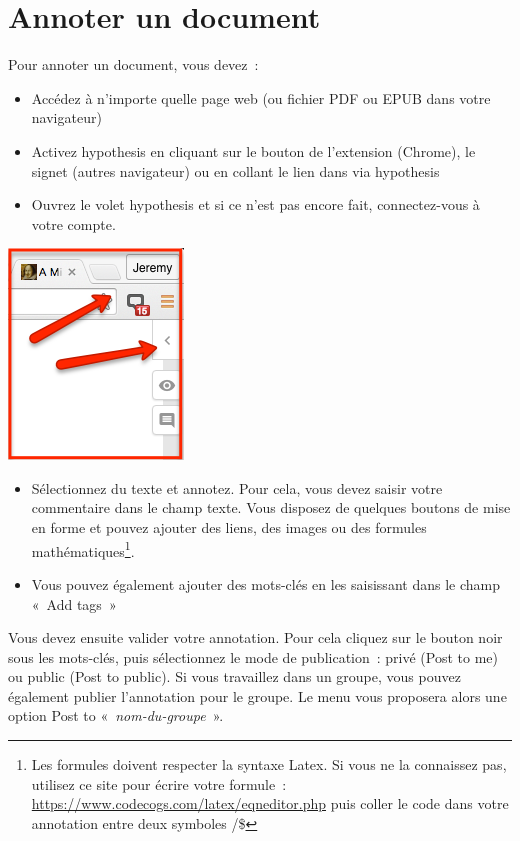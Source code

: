 \documentclass[
]{book}
\providecommand{\tightlist}{%
  \setlength{\itemsep}{0pt}\setlength{\parskip}{0pt}}
\begin{document}
\hypertarget{s3}{%
\chapter{Annoter un document}\label{s3}}

Pour annoter un document, vous devez~:

\begin{itemize}
\tightlist
\item
  Accédez à n'importe quelle page web (ou fichier PDF ou EPUB dans votre navigateur)
\item
  Activez hypothesis en cliquant sur le bouton de l'extension (Chrome), le signet (autres navigateur) ou en collant le lien dans via hypothesis
\item
  Ouvrez le volet hypothesis et si ce n'est pas encore fait, connectez-vous à votre compte.
\end{itemize}

\includegraphics{img/ae9a3a75e6c3a239c6fede86ebe4fa7d.png}

\begin{itemize}
\tightlist
\item
  Sélectionnez du texte et annotez. Pour cela, vous devez saisir votre commentaire dans le champ texte. Vous disposez de quelques boutons de mise en forme et pouvez ajouter des liens, des images ou des formules mathématiques\footnote{Les formules doivent respecter la syntaxe Latex. Si vous ne la connaissez pas, utilisez ce site pour écrire votre formule~: \url{https://www.codecogs.com/latex/eqneditor.php} puis coller le code dans votre annotation entre deux symboles /\$}.
\item
  Vous pouvez également ajouter des mots-clés en les saisissant dans le champ «~Add tags~»
\end{itemize}

Vous devez ensuite valider votre annotation. Pour cela cliquez sur le bouton noir sous les mots-clés, puis sélectionnez le mode de publication~: privé (Post to me) ou public (Post to public). Si vous travaillez dans un groupe, vous pouvez également publier l'annotation pour le groupe. Le menu vous proposera alors une option Post to «~\emph{nom-du-groupe~}».
\end{document}
